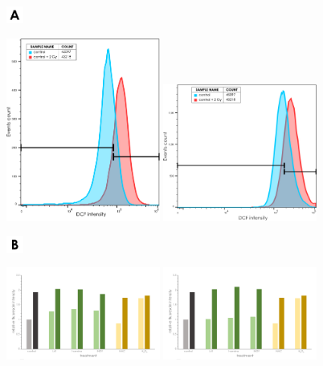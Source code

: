 \documentclass[onecolumn,10pt]{asme2ej}
\begin{document}
\begin{figure}[h]
	\includegraphics[width=0.05\textwidth]{figures/a}
	
	
	\includegraphics[width=0.45\textwidth]{figures/sy5y_dcf}
	\includegraphics[width=0.45\textwidth]{figures/vm_dcf}
	
	\includegraphics[width=0.05\textwidth]{figures/b}	
	
	
	\includegraphics[width=0.45\textwidth]{figures/dcf_sy5y-}
	\includegraphics[width=0.45\textwidth]{figures/dcf_sy5y+}


\end{figure}
\end{document}
